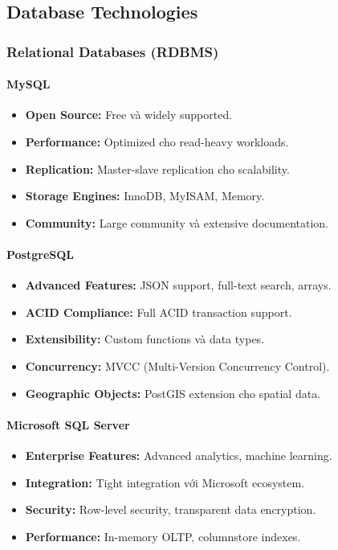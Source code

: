 \documentclass[a4paper,12pt]{report}
\begin{document}
\subsection{Database Technologies}

\subsubsection{Relational Databases (RDBMS)}

\paragraph{MySQL}
\begin{itemize}
    \item \textbf{Open Source:} Free và widely supported.
    \item \textbf{Performance:} Optimized cho read-heavy workloads.
    \item \textbf{Replication:} Master-slave replication cho scalability.
    \item \textbf{Storage Engines:} InnoDB, MyISAM, Memory.
    \item \textbf{Community:} Large community và extensive documentation.
\end{itemize}

\paragraph{PostgreSQL}
\begin{itemize}
    \item \textbf{Advanced Features:} JSON support, full-text search, arrays.
    \item \textbf{ACID Compliance:} Full ACID transaction support.
    \item \textbf{Extensibility:} Custom functions và data types.
    \item \textbf{Concurrency:} MVCC (Multi-Version Concurrency Control).
    \item \textbf{Geographic Objects:} PostGIS extension cho spatial data.
\end{itemize}

\paragraph{Microsoft SQL Server}
\begin{itemize}
    \item \textbf{Enterprise Features:} Advanced analytics, machine learning.
    \item \textbf{Integration:} Tight integration với Microsoft ecosystem.
    \item \textbf{Security:} Row-level security, transparent data encryption.
    \item \textbf{Performance:} In-memory OLTP, columnstore indexes.
\end{itemize}
\end{document}
